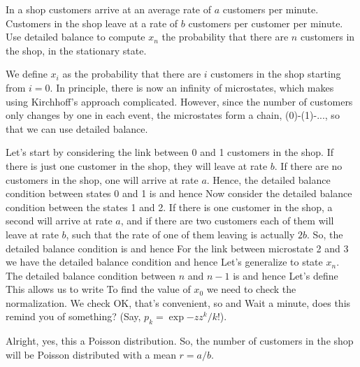 In a shop customers arrive at an average rate of $a$ customers per minute. Customers in the shop leave at a rate of $b$ customers per customer per minute. Use detailed balance to compute $x_n$ the probability that there are $n$ customers in the shop, in the stationary state.  

\solution 
We define $x_i$ as the probability that there are $i$ customers in the shop starting from $i=0$. In principle, there is now an infinity of microstates, which makes using Kirchhoff's approach complicated. However, since the number of customers only changes by one in each event, the microstates form a chain, (0)-(1)-..., so that we can use detailed balance. 

Let's start by considering the link between 0 and 1 customers in the shop. If there is just one customer in the shop, they will leave at rate $b$. If there are no customers in the shop, one will arrive at rate $a$. Hence, the detailed balance condition between states 0 and 1 is 
and hence 
Now consider the detailed balance condition between the states 1 and 2. If there is one customer in the shop, a second will arrive at rate $a$, and if there are two customers each of them will leave at rate $b$, such that the rate of one of them leaving is actually $2b$. So, the detailed balance condition is 
and hence 
For the link between microstate 2 and 3 we have the detailed balance condition 
and hence 
Let's generalize to state $x_n$. The detailed balance condition between $n$ and $n-1$ is 
and hence 
Let's define
This allows us to write 
To find the value of $x_0$ we need to check the normalization. 
We check
OK, that's convenient, so 
and
Wait a minute, does this remind you of something? (Say, $p_k = \exp{-z} z^k /k!$).

Alright, yes, this a Poisson distribution. So, the number of customers in the shop will be Poisson distributed with a mean $r=a/b$. 



